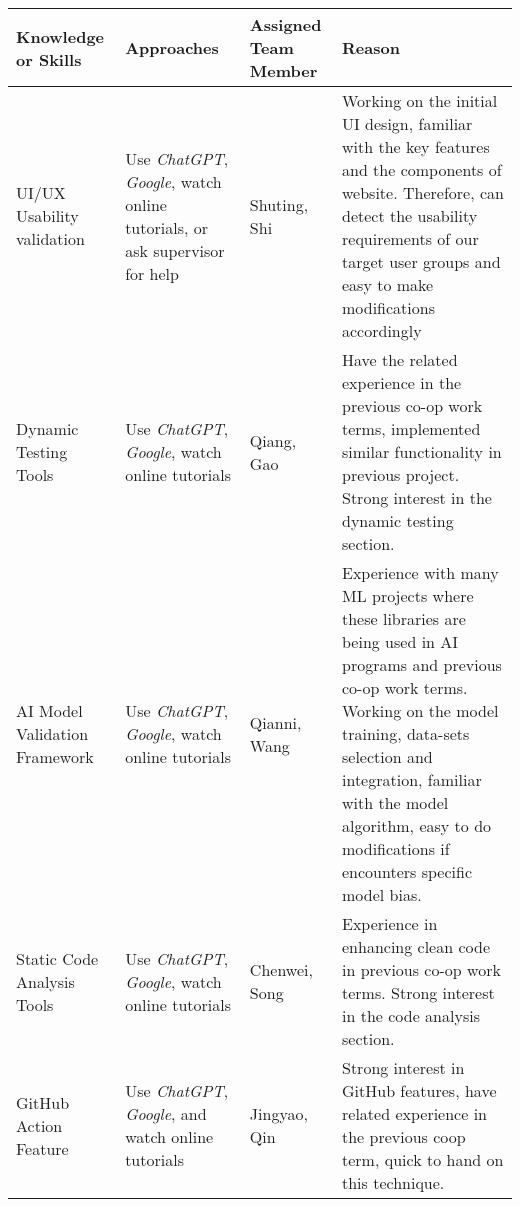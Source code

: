 \documentclass[12pt, titlepage]{article}
\begin{document}
\begin{enumerate}
  \begin{table}[]
    \begin{tabular}{| p{3cm} | p{3.5cm} | p{2cm} | p{5cm} |}
    \hline
      \textbf{Knowledge or Skills} & \textbf{Approaches} & \textbf{Assigned Team Member} & \textbf{Reason} \\
    \hline
      \raggedright UI/UX Usability validation & \raggedright Use \textit{ChatGPT}, \textit{Google}, watch online tutorials, or ask supervisor for help  & Shuting, Shi & Working on the initial UI design, familiar with the key features and the components of website. Therefore, can detect the usability requirements of our target user groups and easy to make modifications accordingly \\
    \hline
      \raggedright  Dynamic Testing Tools & \raggedright Use \textit{ChatGPT}, \textit{Google}, watch online tutorials & Qiang, Gao & Have the related experience in the previous co-op work terms, implemented similar functionality in previous project. Strong interest in the dynamic testing section. \\
    \hline
      \raggedright AI Model Validation Framework & \raggedright Use \textit{ChatGPT}, \textit{Google}, watch online tutorials & Qianni, Wang & Experience with many ML projects where these libraries are being used in AI programs and previous co-op work terms. Working on the model training,  data-sets selection and integration, familiar with the model algorithm, easy to do modifications if encounters specific model bias. \\
    \hline
      \raggedright Static Code Analysis Tools & \raggedright Use \textit{ChatGPT}, \textit{Google}, watch online tutorials & Chenwei, Song & Experience in enhancing clean code in previous co-op work terms. Strong interest in the code analysis section. \\
    \hline
      \raggedright GitHub Action Feature & \raggedright Use \textit{ChatGPT}, \textit{Google}, and watch online tutorials & Jingyao, Qin & Strong interest in GitHub features, have related experience in the previous coop term, quick to hand on this technique. \\
    \hline
    \end{tabular}
\end{table}
\end{enumerate}
\end{document}
